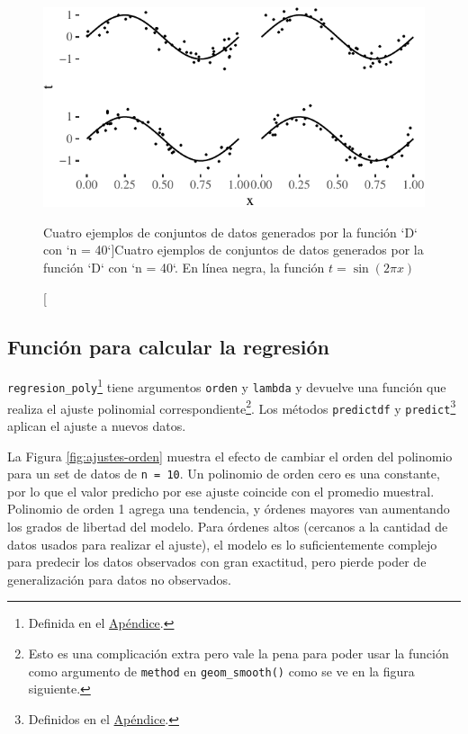 \documentclass[]{tufte-handout}
\begin{document}
\begin{figure}
\includegraphics{TP-Labo-1_files/figure-latex/unnamed-chunk-2-1} \caption[Cuatro ejemplos de conjuntos de datos generados por la función `D` con `n = 40`]{Cuatro ejemplos de conjuntos de datos generados por la función `D` con `n = 40`. En línea negra, la función $t = \sin(2\pi x)$}\label{fig:unnamed-chunk-2}
\end{figure}

\hypertarget{funciuxf3n-para-calcular-la-regresiuxf3n}{%
\subsection{Función para calcular la regresión}\label{funciuxf3n-para-calcular-la-regresiuxf3n}}

\texttt{regresion\_poly}\footnote{Definida en el \protect\hyperlink{def-regr}{Apéndice}.} tiene argumentos \texttt{orden} y \texttt{lambda} y devuelve una función que realiza el ajuste polinomial correspondiente\footnote{Esto es una complicación extra pero vale la pena para poder usar la función como argumento de \texttt{method} en \texttt{geom\_smooth()} como se ve en la figura siguiente.}. Los métodos \texttt{predictdf} y \texttt{predict}\footnote{Definidos en el \protect\hyperlink{def-regr}{Apéndice}.} aplican el ajuste a nuevos datos.

La Figura \ref{fig:ajustes-orden} muestra el efecto de cambiar el orden del polinomio para un set de datos de \texttt{n\ =\ 10}. Un polinomio de orden cero es una constante, por lo que el valor predicho por ese ajuste coincide con el promedio muestral. Polinomio de orden 1 agrega una tendencia, y órdenes mayores van aumentando los grados de libertad del modelo. Para órdenes altos (cercanos a la cantidad de datos usados para realizar el ajuste), el modelo es lo suficientemente complejo para predecir los datos observados con gran exactitud, pero pierde poder de generalización para datos no observados.
\end{document}
